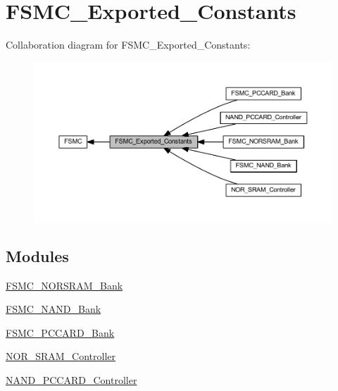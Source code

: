 \hypertarget{group___f_s_m_c___exported___constants}{}\section{F\+S\+M\+C\+\_\+\+Exported\+\_\+\+Constants}
\label{group___f_s_m_c___exported___constants}
Collaboration diagram for F\+S\+M\+C\+\_\+\+Exported\+\_\+\+Constants\+:
\nopagebreak
\begin{figure}[H]
\begin{center}
\leavevmode
\includegraphics[width=350pt]{group___f_s_m_c___exported___constants}
\end{center}
\end{figure}
\subsection*{Modules}
\begin{DoxyCompactItemize}
\item 
\hyperlink{group___f_s_m_c___n_o_r_s_r_a_m___bank}{F\+S\+M\+C\+\_\+\+N\+O\+R\+S\+R\+A\+M\+\_\+\+Bank}
\item 
\hyperlink{group___f_s_m_c___n_a_n_d___bank}{F\+S\+M\+C\+\_\+\+N\+A\+N\+D\+\_\+\+Bank}
\item 
\hyperlink{group___f_s_m_c___p_c_c_a_r_d___bank}{F\+S\+M\+C\+\_\+\+P\+C\+C\+A\+R\+D\+\_\+\+Bank}
\item 
\hyperlink{group___n_o_r___s_r_a_m___controller}{N\+O\+R\+\_\+\+S\+R\+A\+M\+\_\+\+Controller}
\item 
\hyperlink{group___n_a_n_d___p_c_c_a_r_d___controller}{N\+A\+N\+D\+\_\+\+P\+C\+C\+A\+R\+D\+\_\+\+Controller}
\end{DoxyCompactItemize}
